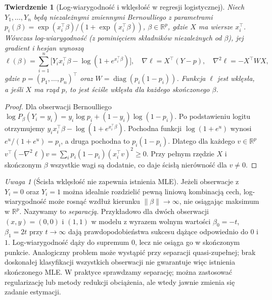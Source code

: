 \documentclass[11pt,a4paper,oneside]{report}
\numberwithin{equation}{chapter}
\theoremstyle{plain}
\newtheorem{twierdzenie}{Twierdzenie}[chapter]
\theoremstyle{definition}
\theoremstyle{remark}
\newtheorem{uwaga}{Uwaga}[chapter]
\newcommand{\R}{\mathbb R}
\begin{document}
\begin{twierdzenie}[Log-wiarygodność i wklęsłość w regresji logistycznej]
\label{thm:logit-score}
Niech $Y_1,\ldots,Y_n$ będą niezależnymi zmiennymi
Bernoulliego z parametrami
$p_i(\beta)=\exp(x_i^\top\beta)/
(1+\exp(x_i^\top\beta))$, $\beta\in\R^p$, gdzie
$X$ ma wiersze $x_i^\top$. Wówczas log-wiarygodność
(z pominięciem składników niezależnych od $\beta$),
jej gradient i hesjan wynoszą
\[
 \ell(\beta)=\sum_{i=1}^n\bigl[Y_i x_i^\top\beta
        -\log(1+e^{x_i^\top\beta})\bigr],\quad
 \nabla\ell=X^\top(Y-p),\quad
 \nabla^2\ell=-X^\top W X,
\]
gdzie $p=(p_1,\ldots,p_n)^\top$ oraz
$W=\operatorname{diag}(p_i(1-p_i))$.
Funkcja $\ell$ jest wklęsła, a jeśli $X$ ma rząd $p$,
to jest ściśle wklęsła dla każdego skończonego $\beta$.
\end{twierdzenie}
\begin{proof}
Dla obserwacji Bernoulliego
$\log P_\beta(Y_i=y_i)=y_i\log p_i+(1-y_i)\log(1-p_i)$.
Po podstawieniu logitu otrzymujemy
$y_ix_i^\top\beta-\log(1+e^{x_i^\top\beta})$.
Pochodna funkcji $\log(1+e^u)$ wynosi
$e^u/(1+e^u)=p_i$, a druga pochodna to $p_i(1-p_i)$.
Dlatego dla każdego $v\in\R^p$
$v^\top(-\nabla^2\ell)v=
\sum_i p_i(1-p_i)(x_i^\top v)^2\ge0$.
Przy pełnym rzędzie $X$ i skończonym $\beta$ wszystkie
wagi są dodatnie, co daje ścisłą nierówność dla $v\ne0$.
\end{proof}

\begin{uwaga}[Ścisła wklęsłość nie zapewnia istnienia MLE]
\label{rem:glm-separation}
Jeżeli obserwacje z $Y_i=0$ oraz $Y_i=1$ można
idealnie rozdzielić pewną liniową kombinacją cech,
log-wiarygodność może rosnąć wzdłuż kierunku
$\|\beta\|\to\infty$, nie osiągając maksimum
w $\R^p$. Nazywamy to \emph{separacją}.
Przykładowo dla dwóch obserwacji $(x,y)=(0,0)$
i $(1,1)$ w modelu z wyrazem wolnym wartości
$\beta_0=-t$, $\beta_1=2t$ przy $t\to\infty$
dają prawdopodobieństwa sukcesu dążące odpowiednio
do $0$ i $1$. Log-wiarygodność dąży do supremum
$0$, lecz nie osiąga go w skończonym punkcie.
Analogiczny problem może wystąpić przy separacji
quasi-zupełnej; brak doskonałej klasyfikacji wszystkich
obserwacji nie gwarantuje więc istnienia skończonego MLE.
W praktyce sprawdzamy separację; można zastosować
regularizację lub metody redukcji obciążenia, ale
wtedy jawnie zmienia się zadanie estymacji.
\end{uwaga}
\end{document}
